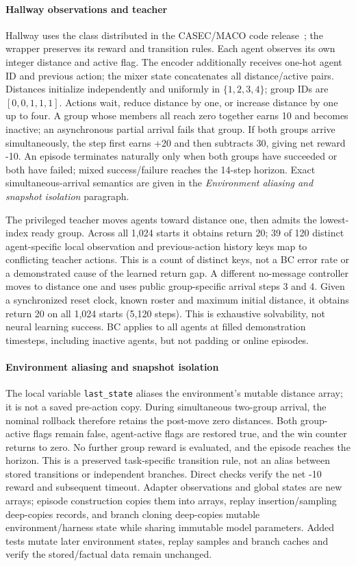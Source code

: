 \documentclass[pdflatex,sn-mathphys-num]{sn-jnl}
\begin{document}
\paragraph{Hallway observations and teacher}\label{app:local_clock} Hallway uses the class distributed in the CASEC/MACO code release~\citep{wang2022casec}; the wrapper preserves its reward and transition rules. Each agent observes its own integer distance and active flag. The encoder additionally receives one-hot agent ID and previous action; the mixer state concatenates all distance/active pairs. Distances initialize independently and uniformly in $\{1,2,3,4\}$; group IDs are $[0,0,1,1,1]$. Actions wait, reduce distance by one, or increase distance by one up to four. A group whose members all reach zero together earns 10 and becomes inactive; an asynchronous partial arrival fails that group. If both groups arrive simultaneously, the step first earns +20 and then subtracts 30, giving net reward -10. An episode terminates naturally only when both groups have succeeded or both have failed; mixed success/failure reaches the 14-step horizon. Exact simultaneous-arrival semantics are given in the \emph{Environment aliasing and snapshot isolation} paragraph.

The privileged teacher moves agents toward distance one, then admits the lowest-index ready group. Across all 1,024 starts it obtains return 20; 39 of 120 distinct agent-specific local observation and previous-action history keys map to conflicting teacher actions. This is a count of distinct keys, not a BC error rate or a demonstrated cause of the learned return gap. A different no-message controller moves to distance one and uses public group-specific arrival steps 3 and 4. Given a synchronized reset clock, known roster and maximum initial distance, it obtains return 20 on all 1,024 starts (5,120 steps). This is exhaustive solvability, not neural learning success. BC applies to all agents at filled demonstration timesteps, including inactive agents, but not padding or online episodes.

\paragraph{Environment aliasing and snapshot isolation}
The local variable \texttt{last\_state} aliases the environment's mutable distance array; it is not a saved pre-action copy. During simultaneous two-group arrival, the nominal rollback therefore retains the post-move zero distances. Both group-active flags remain false, agent-active flags are restored true, and the win counter returns to zero. No further group reward is evaluated, and the episode reaches the horizon. This is a preserved task-specific transition rule, not an alias between stored transitions or independent branches. Direct checks verify the net -10 reward and subsequent timeout. Adapter observations and global states are new arrays; episode construction copies them into arrays, replay insertion/sampling deep-copies records, and branch cloning deep-copies mutable environment/harness state while sharing immutable model parameters. Added tests mutate later environment states, replay samples and branch caches and verify the stored/factual data remain unchanged.
\end{document}
